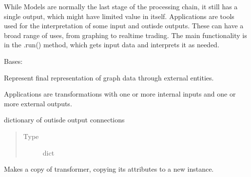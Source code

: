 \documentclass[letterpaper,10pt,english]{sphinxmanual}
\begin{document}
While Models are normally the last stage of the processing chain, it
still has a single output, which might have limited value in itself.
Applications are tools used for the interpretation of some input and
outisde outputs. These can have a broad range of uses, from graphing to
real\sphinxhyphen{}time trading. The main functionality is in the .run() method, which
gets input data and interprets it as needed.

\begin{fulllineitems}
\label{\detokenize{dalio.application:dalio.application.application.Application}}
Bases: {\hyperref[\detokenize{dalio.model:dalio.model.model.Model}]{}}

Represent final representation of graph data through external entities.

Applications are transformations with one or more internal inputs and one
or more external outputs.

\begin{fulllineitems}
\label{\detokenize{dalio.application:dalio.application.application.Application._out}}
dictionary of outisde output connections
\begin{quote}\begin{description}
\item[{Type}] \leavevmode
dict

\end{description}\end{quote}

\end{fulllineitems}


\begin{fulllineitems}
\label{\detokenize{dalio.application:dalio.application.application.Application.copy}}
Makes a copy of transformer, copying its attributes to a new
instance.


\end{fulllineitems}
\end{fulllineitems}
\end{document}
